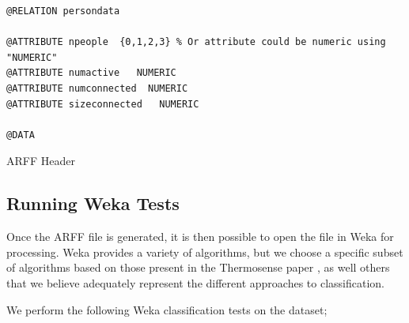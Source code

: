 \documentclass[../thesis/thesis.tex]{subfiles}
\begin{document}
\begin{listing}
\centering
\begin{verbatim}
@RELATION persondata

@ATTRIBUTE npeople  {0,1,2,3} % Or attribute could be numeric using "NUMERIC"
@ATTRIBUTE numactive   NUMERIC
@ATTRIBUTE numconnected  NUMERIC
@ATTRIBUTE sizeconnected   NUMERIC

@DATA
\end{verbatim}
\caption{ARFF Header}
\label{lst:methods:arff}
\end{listing}

\subsection{Running Weka Tests}
Once the ARFF file is generated, it is then possible to open the file in Weka for processing. Weka provides a variety of algorithms, but we choose a specific subset of algorithms based on those present in the Thermosense paper \cite{beltran2013thermosense}, as well others that we believe adequately represent the different approaches to classification.

We perform the following Weka classification tests on the dataset;
\end{document}
